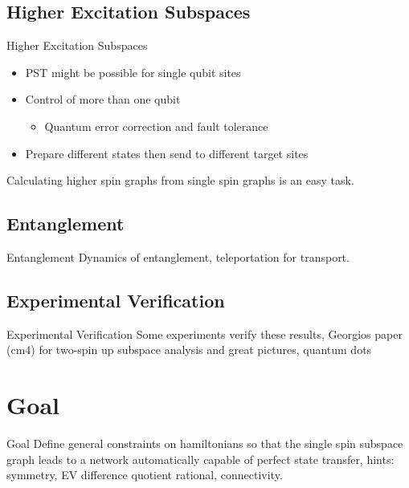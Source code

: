 \documentclass{beamer}
\begin{document}
\subsection{Higher Excitation Subspaces}
\begin{frame}{Higher Excitation Subspaces} %
	\begin{itemize}
		\item PST might be possible for single qubit sites
		\item Control of more than one qubit
		\begin{itemize}
			\item Quantum error correction and fault tolerance
		\end{itemize}
		\item Prepare different states then send to different target sites
	\end{itemize}
	Calculating higher spin graphs from single spin graphs is an easy task.
\end{frame}

\subsection{Entanglement}
\begin{frame}{Entanglement}
    Dynamics of entanglement, teleportation for transport.
\end{frame}

\subsection{Experimental Verification}
\begin{frame}{Experimental Verification}
    Some experiments verify these results, Georgios paper (cm4) for two-spin up subspace analysis and great pictures, quantum dots
\end{frame}

\section{Goal}
\begin{frame}{Goal}
    Define general constraints on hamiltonians so that the single spin subspace graph leads to a network automatically capable of perfect state transfer, hints: symmetry, EV difference quotient rational, connectivity.
\end{frame}
\end{document}
